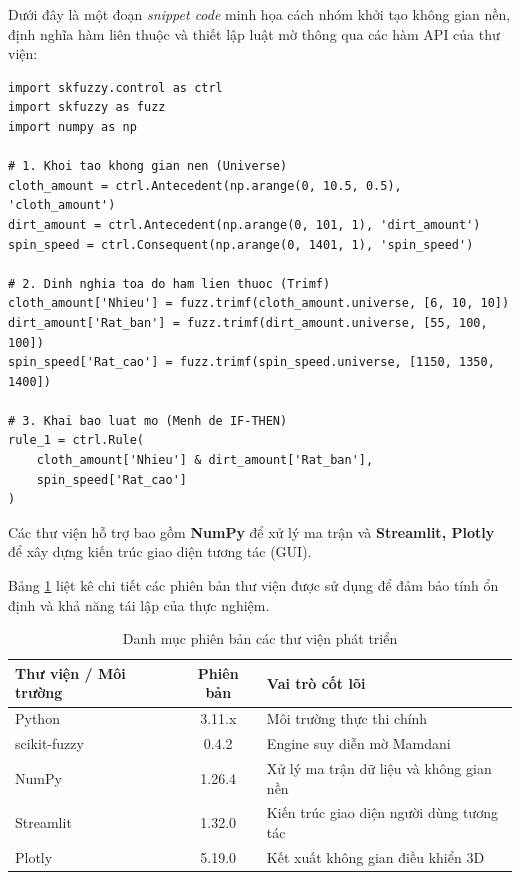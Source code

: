 \documentclass[12pt, a4paper]{article}
\begin{document}
Dưới đây là một đoạn \textit{snippet code} minh họa cách nhóm khởi tạo không gian nền, định nghĩa hàm liên thuộc và thiết lập luật mờ thông qua các hàm API của thư viện:

\begin{lstlisting}[caption={Minh họa cách định nghĩa biến và luật mờ bằng skfuzzy}, label={lst:fuzzy_snippet}]
import skfuzzy.control as ctrl
import skfuzzy as fuzz
import numpy as np

# 1. Khoi tao khong gian nen (Universe)
cloth_amount = ctrl.Antecedent(np.arange(0, 10.5, 0.5), 'cloth_amount')
dirt_amount = ctrl.Antecedent(np.arange(0, 101, 1), 'dirt_amount')
spin_speed = ctrl.Consequent(np.arange(0, 1401, 1), 'spin_speed')

# 2. Dinh nghia toa do ham lien thuoc (Trimf)
cloth_amount['Nhieu'] = fuzz.trimf(cloth_amount.universe, [6, 10, 10])
dirt_amount['Rat_ban'] = fuzz.trimf(dirt_amount.universe, [55, 100, 100])
spin_speed['Rat_cao'] = fuzz.trimf(spin_speed.universe, [1150, 1350, 1400])

# 3. Khai bao luat mo (Menh de IF-THEN)
rule_1 = ctrl.Rule(
    cloth_amount['Nhieu'] & dirt_amount['Rat_ban'], 
    spin_speed['Rat_cao']
)
\end{lstlisting}

Các thư viện hỗ trợ bao gồm \textbf{NumPy} để xử lý ma trận và \textbf{Streamlit, Plotly} để xây dựng kiến trúc giao diện tương tác (GUI).

Bảng \ref{tab:versions} liệt kê chi tiết các phiên bản thư viện được sử dụng để đảm bảo tính ổn định và khả năng tái lập của thực nghiệm.

\begin{table}[H]
    \centering
    \caption{Danh mục phiên bản các thư viện phát triển}
    \label{tab:versions}
    \begin{tabular}{|l|c|l|}
        \hline
        \textbf{Thư viện / Môi trường} & \textbf{Phiên bản} & \textbf{Vai trò cốt lõi} \\
        \hline
        Python & 3.11.x & Môi trường thực thi chính \\
        \hline
        scikit-fuzzy & 0.4.2 & Engine suy diễn mờ Mamdani \\
        \hline
        NumPy & 1.26.4 & Xử lý ma trận dữ liệu và không gian nền \\
        \hline
        Streamlit & 1.32.0 & Kiến trúc giao diện người dùng tương tác \\
        \hline
        Plotly & 5.19.0 & Kết xuất không gian điều khiển 3D \\
        \hline
    \end{tabular}
\end{table}
\end{document}
